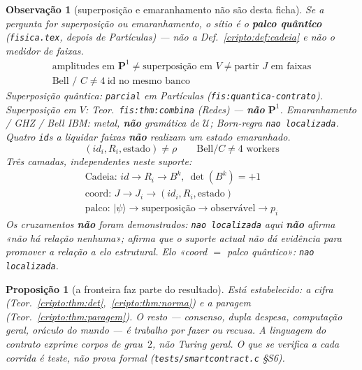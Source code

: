 \documentclass[11pt,a4paper]{article}
\newcommand{\code}[1]{\texttt{\small #1}}
\newtheorem{proposicao}[teorema]{Proposição}
\newtheorem{observacao}[teorema]{Observação}
\begin{document}
\begin{observacao}[superposição e emaranhamento não são desta ficha]\label{cripto:obs:coord-quantica}
Se a pergunta for superposição ou emaranhamento, o sítio é o
\textbf{palco quântico} (\code{fisica.tex}, depois de Partículas) ---
não a Def.~\ref{cripto:def:cadeia} e não o medidor de faixas.
\[
\boxed{\;
\begin{array}{c}
\text{amplitudes em }\mathbf{P}^{1}
\neq
\text{superposição em }V
\neq
\text{partir }J\text{ em faixas}\\[0.4em]
\text{Bell / }C
\neq
4\ \mathrm{id}\text{ no mesmo banco}
\end{array}
\;}
\]
Superposição quântica: \texttt{parcial} em Partículas
(\code{fis:quantica-contrato}).
Superposição em $V$: Teor.~\code{fis:thm:combina} (Redes) ---
\textbf{não} $\mathbf{P}^{1}$.
Emaranhamento / GHZ / Bell IBM: metal,
\textbf{não} gramática de $\mathcal{U}$;
Born-\emph{regra} \texttt{nao localizada}.
Quatro \code{id}s a liquidar faixas \textbf{não} realizam
um estado emaranhado.
\[
\boxed{\;
(id_i,R_i,\text{estado})
\neq
\rho
\qquad
\text{Bell}/C
\neq
4\text{ workers}
\;}
\]
Três camadas, independentes neste suporte:
\[
\boxed{\;
\begin{array}{c}
\text{Cadeia: }id\to R_i\to B^{k},\ \det(B^{k})=+1\\
\text{coord: }J\to J_i\to(id_i,R_i,\text{estado})\\
\text{palco: }\lvert\psi\rangle\to\text{superposição}\to\text{observável}\to p_i
\end{array}
\;}
\]
Os cruzamentos \textbf{não} foram demonstrados:
\texttt{nao localizada} aqui \textbf{não} afirma «não há relação nenhuma»;
afirma que o suporte actual não dá evidência para promover a relação
a elo estrutural.
Elo «coord $=$ palco quântico»: \texttt{nao localizada}.
\end{observacao}

\begin{proposicao}[a fronteira faz parte do resultado]\label{cripto:prop:fronteira}
Está estabelecido: a cifra (Teor.~\ref{cripto:thm:det},~\ref{cripto:thm:norma})
e a paragem (Teor.~\ref{cripto:thm:paragem}).
O resto --- consenso, dupla despesa, computação geral, oráculo do mundo ---
é trabalho por fazer ou recusa.
A linguagem do contrato exprime corpos de grau~$2$, não Turing geral.
O que se verifica a cada corrida é teste, não prova formal
(\code{tests/smartcontract.c} §S6).
\end{proposicao}

\end{document}
